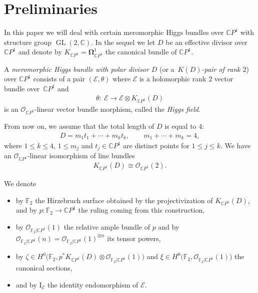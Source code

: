 \documentclass[10pt,a4paper]{amsart}
\newcommand{\C}{{\mathbb C}} %
\renewcommand{\O}{{\mathcal O}} %
\newcommand{\CP}[1]{\mathbb{C}P^{#1}} %
\newcommand{\E}{{\mathcal E}} %
\DeclareMathOperator{\Gl}{GL}
\numberwithin{equation}{section}
\begin{document}
\section{Preliminaries}\label{sec:prelims}

In this paper we will deal with certain meromorphic Higgs bundles over $\CP1$ with structure group $\Gl(2,\C)$.
In the sequel we let $D$ be an effective divisor over $\CP1$ and denote by $K_{\CP1} = \mathbf{\Omega}_{\CP1}^1$ the canonical bundle of $\CP1$.

\begin{defn}A {\it meromorphic Higgs bundle with polar divisor $D$} (or a~{\it $K(D)$-pair of rank $2$}) over $\CP1$ consists of a pair $(\E,
\theta)$ where $\E$ is a holomorphic rank $2$ vector bundle over~$\CP1$ and
\begin{gather*}
 \theta\colon \ \E \to \E \otimes K_{\CP1}(D)
\end{gather*}
is an $\O_{\CP1}$-linear vector bundle morphism, called the {\it Higgs field}.
\end{defn}

From now on, we assume that the total length of $D$ is equal to $4$:
\begin{gather}\label{eq:divisor}
 D = m_1 t_1 + \cdots + m_k t_k, \qquad m_1 + \cdots + m_k = 4,
\end{gather}
where $1 \leq k \leq 4$, $1\leq m_j$ and $t_j \in \CP1$ are distinct points for $1 \leq j \leq k$.
We have an $\O_{\CP1}$-linear isomorphism of line bundles
\begin{gather}\label{eq:KDO2}
 K_{\CP1}(D) \cong \O_{\CP1}(2).
\end{gather}

We denote
\begin{itemize}\itemsep=0pt
 \item {by ${\mathbb {F}}_2$ the Hirzebruch surface obtained
 by the projectivization of $K_{\CP1}(D)$, and by $p\colon {\mathbb
 {F}}_2 \to \CP1$ the ruling coming from this construction,}
 \item by $\O_{{\mathbb {F}}_2 | \CP1}(1)$ the relative ample bundle
 of $p$ and by $\O_{{\mathbb {F}}_2 | \CP1}(n) = \O_{{\mathbb {F}}_2
 | \CP1}(1)^{\otimes n}$ its tensor powers,
 \item by $\zeta \in H^0 \big({\mathbb {F}}_2 ,p^* K_{\CP1}(D)
 \otimes \O_{{\mathbb {F}}_2 | \CP1}(1) \big)$ and $\xi \in H^0
 \big({\mathbb {F}}_2 , \O_{{\mathbb {F}}_2 | \CP1}(1) \big)$ the
 canonical sections,
 \item and by $\mbox{I}_{\E}$ the identity endomorphism of $\E$.
\end{itemize}
\end{document}
